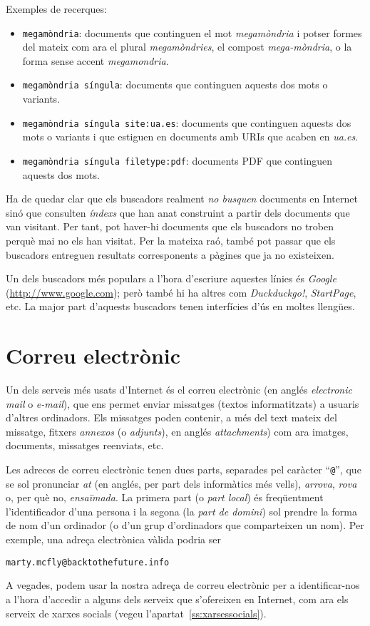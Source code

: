 Exemples de recerques:
\begin{itemize}
\item \texttt{megamòndria}: documents que continguen el mot
  \emph{megamòndria} i potser formes del mateix com ara el plural
  \emph{megamòndries}, el compost \emph{mega-mòndria}, o la forma
  sense accent \emph{megamondria}.
\item \texttt{megamòndria síngula}: documents que continguen aquests
  dos mots o variants.
\item \texttt{megamòndria síngula site:ua.es}: documents que
  continguen aquests dos mots o variants i que estiguen en documents
  amb URIs que acaben en \emph{ua.es}.
\item \texttt{megamòndria síngula filetype:pdf}: documents PDF que
  continguen aquests dos mots.
\end{itemize}

Ha de quedar clar que els buscadors realment \emph{no busquen}
documents en Internet sinó que consulten \emph{índexs} que han anat
construint a partir dels documents que van visitant. Per tant, pot
haver-hi documents que els buscadors no troben perquè mai no els han
visitat. Per la mateixa raó, també pot passar que els buscadors
entreguen resultats corresponents a pàgines que ja no existeixen.

Un dels buscadors més populars a l'hora d'escriure aquestes línies és
\emph{Google} (\url{http://www.google.com}); però també hi ha altres
com \emph{Duckduckgo!}, \emph{StartPage}, etc. La major part d'aquests
buscadors tenen interfícies d'ús en moltes llengües.

\section{Correu electrònic}
\label{ss:correue}
Un dels serveis més usats d'Internet és el correu electrònic (en
anglés \emph{electronic mail} o \emph{e-mail}), que ens permet enviar
missatges (textos informatitzats) a usuaris d'altres ordinadors.  Els
missatges poden contenir, a més del text mateix del missatge, fitxers
\emph{annexos} (o \emph{adjunts}), en anglés \emph{attachments}) com
ara imatges, documents, missatges reenviats, etc.

Les adreces de correu electrònic tenen dues parts, separades pel
caràcter ``\texttt{@}'', que se sol pronunciar \emph{at} (en anglés,
per part dels informàtics més vells), {\em arrova}, \emph{rova} o, per
què no, \emph{ensaïmada}. La primera part (o \emph{part local}) és
freqüentment l'identificador d'una persona i la segona (la \emph{part
  de domini}) sol prendre la forma de nom d'un ordinador (o d'un grup
d'ordinadors que comparteixen un nom). Per exemple, una adreça
electrònica vàlida podria ser
\begin{center}
\texttt{marty.mcfly@backtothefuture.info}
\end{center}
A vegades, podem usar la nostra adreça de correu electrònic per a
identificar-nos a l'hora d'accedir a alguns dels serveix que
s'ofereixen en Internet, com ara els serveix de xarxes socials (vegeu
l'apartat~\ref{ss:xarsessocials}).

